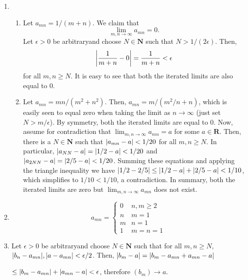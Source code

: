 \documentclass{article}
\DeclarePairedDelimiter\abs{\lvert}{\rvert}
\newcommand{\N}{\mathbf{N}}
\newcommand{\R}{\mathbf{R}}
\newcommand{\lep}[1][L]{#1et $\epsilon > 0$ be arbitrary}
\begin{document}
\begin{enumerate}
\begin{enumerate}
	\item \begin{enumerate}
	\item Let $a_{mn} = 1/(m+n)$. We claim that \begin{equation*}
	      \lim_{m, n \to \infty} a_{mn} = 0.
	\end{equation*} \lep \space and choose $N \in \N$ such that $N > 1/(2\epsilon)$. Then, \begin{equation*}
	\abs*{\frac{1}{m+n} - 0} = \frac{1}{m+n} < \epsilon
	\end{equation*} for all $m,n \geq N$. It is easy to see that both the iterated limits are also equal to $0$.
			        
	\item Let $a_{mn}= mn/(m^2+n^2)$. Then, $a_{mn} = m/(m^2/n+n)$, which is easily seen to equal zero when taking the limit as $n \to \infty$ (just set $N > m/\epsilon$). By symmetry, both the iterated limits are equal to $0$. Now, assume for contradiction that $\lim_{m,n \to \infty} a_{mn}= a$ for some $a \in \R$. Then, there is a $N \in \N$ such that $\abs*{a_{mn} - a}  < 1/20$ for all $m,n \geq N$. In particular, $\abs*{a_{NN}-a} = \abs*{1/2-a} < 1/20$ and $\abs*{a_{2N N} - a} = \abs*{2/5-a} < 1/20$. Summing these equations and applying the triangle inequality we have $\abs*{1/2-2/5}\leq \abs*{1/2-a}+\abs*{2/5-a}<1/10$, which simplifies to $1/10 < 1/10$, a contradiction. In summary, both the iterated limits are zero but $\lim_{m,n \to \infty} a_{mn}$ does not exist.
\end{enumerate}
	    
    \item \begin{equation*}
    a_{m n} = \begin{cases}
    0 & n,m \geq 2 \\
    n & m = 1 \\
    m & n = 1 \\
    1 & m = n = 1
    \end{cases}
    \end{equation*}
    	        
    \item \lep \space and choose $N \in \N$ such that for all $m,n \geq N$, $\abs*{b_n-a_{mn}}, \abs*{a-a_{mn}} < \epsilon/2$. Then, $\abs*{b_m-a} = \abs*{b_m-a_{mn} + a_{mn} - a}$ 
    
    \noindent $\leq \abs*{b_m-a_{mn}} + \abs*{a_{mn}-a} < \epsilon$, therefore $(b_m) \to a$.
    \end{enumerate}
    	

\end{enumerate}
\end{document}
